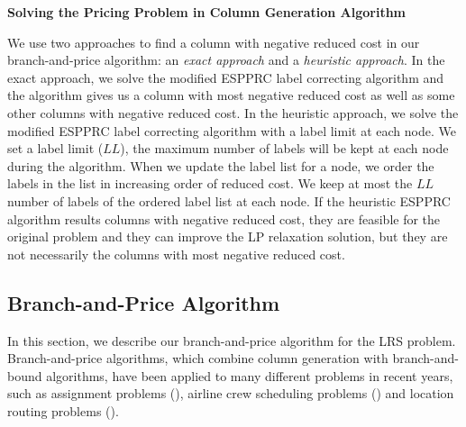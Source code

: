 






{\bf Solving the Pricing Problem in Column Generation Algorithm}
 
We use two approaches to find a column with negative reduced cost in our branch-and-price 
algorithm:  an {\em exact approach} and a {\em heuristic approach}. In the 
exact approach, we solve the modified ESPPRC label correcting algorithm and the algorithm 
gives us a column with most negative reduced cost as well as some other columns with negative 
reduced cost. In the heuristic approach, we solve the modified ESPPRC label correcting algorithm
with a label limit  at each node. We set a label limit ($LL$), the maximum number of
labels will be kept at each node during the algorithm. When we update the label list for 
a node, we order the labels in the list in increasing order of reduced cost. We keep at most
the $LL$ number of labels of the ordered label list at each node. If the heuristic ESPPRC algorithm results
columns with negative reduced cost, they are feasible for the original problem and they can
improve the LP relaxation solution, but they are not necessarily the columns with most negative 
reduced cost. 



\subsection{Branch-and-Price Algorithm}
\label{BPAlg}
In this section, we describe our branch-and-price algorithm for the LRS problem.
Branch-and-price algorithms, which combine column generation with branch-and-bound 
algorithms, have been applied to many different problems in recent years, such as 
assignment problems (\citet{Savelsbergh}), airline crew scheduling problems (\citet{Vance}) 
and location routing problems (\citet{Berger05}).


